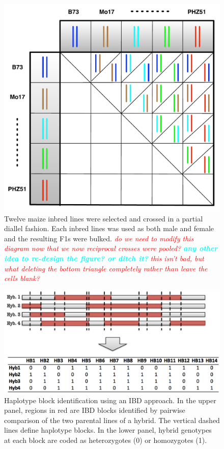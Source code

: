 \documentclass[9pt,twocolumn,twoside]{gsajnl}
\newcommand{\yang}[1]{\textcolor{cyan}{\emph{\bf  #1}} }
\newcommand{\jri}[1]{\textcolor{red}{ \emph{ #1}} }
\begin{document}
\begin{figure}[htbp]
\centering
\includegraphics[width=\linewidth]{SFig_diallel.pdf}
\caption{Twelve maize inbred lines were selected and crossed in a partial diallel fashion. Each inbred lines was used as both male and female and the resulting F1s were bulked. \jri{do we need to modify this diagram now that we now reciprocal crosses were pooled?} \yang{any other idea to re-design the figure? or ditch it?} \jri{this isn't bad, but what deleting the bottom triangle completely rather than leave the cells blank?} }
\label{fig:diallel}
\end{figure}


\begin{figure}[htbp]
\centering
\includegraphics[width=\linewidth]{SFig_define_IBD.pdf}
\caption{Haplotype block identification using an IBD approach. In the upper panel, regions in red are IBD blocks identified by pairwise comparison of the two parental lines of a hybrid. The vertical dashed lines define haplotype blocks. In the lower panel, hybrid genotypes at each block are coded as heterozygotes (0) or homozygotes (1).}
\label{fig:defineibd}
\end{figure}
\end{document}
